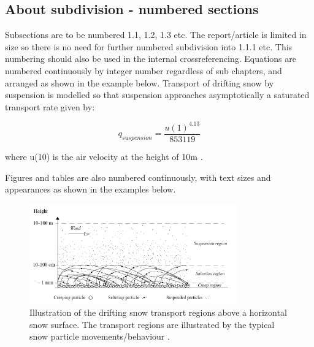 \documentclass[a4paper,11pt]{extarticle}
\begin{document}
\subsection{About subdivision - numbered sections}
Subsections are to be numbered 1.1, 1.2, 1.3 etc. The report/article is limited in size so there is no need for further numbered subdivision into 1.1.1 etc. This numbering should also be used in the internal crossreferencing. Equations are numbered continuously by integer number regardless of sub chapters, and arranged as shown in the example below. Transport of drifting snow by suspension is modelled so that suspension approaches asymptotically a saturated transport rate given by:

\begin{equation}
  q_{suspension} = \frac{u(1)^{4.13}}{853119}
  \label{eq:FirstEquation}
\end{equation}

where u(10) is the air velocity at the height of 10m \citep{Tabler1990}.

Figures and tables are also numbered continuously, with text sizes and appearances as shown in the examples below. 

\begin{figure}[H]
  \centering
  \includegraphics[width=0.8\textwidth]{SnowTransport.png}
  \caption{Illustration of the drifting snow transport regions above a horizontal snow surface. The transport regions are illustrated by the typical snow particle movements/behaviour \citep{Sundsbo1997}.}
  \label{fig:SnowTransport}
\end{figure}
\end{document}
